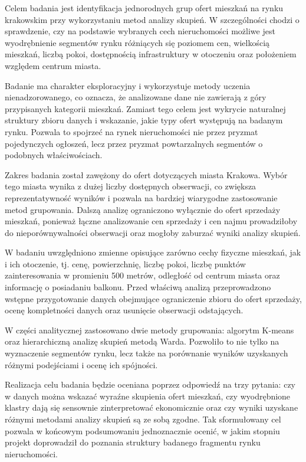 \documentclass{report}
\begin{document}
Celem badania jest identyfikacja jednorodnych grup ofert mieszkań na rynku krakowskim przy wykorzystaniu metod analizy skupień. W szczególności chodzi o sprawdzenie, czy na podstawie wybranych cech nieruchomości możliwe jest wyodrębnienie segmentów rynku różniących się poziomem cen, wielkością mieszkań, liczbą pokoi, dostępnością infrastruktury w otoczeniu oraz położeniem względem centrum miasta.

Badanie ma charakter eksploracyjny i wykorzystuje metody uczenia nienadzorowanego, co oznacza, że analizowane dane nie zawierają z góry przypisanych kategorii mieszkań. Zamiast tego celem jest wykrycie naturalnej struktury zbioru danych i wskazanie, jakie typy ofert występują na badanym rynku. Pozwala to spojrzeć na rynek nieruchomości nie przez pryzmat pojedynczych ogłoszeń, lecz przez pryzmat powtarzalnych segmentów o podobnych właściwościach.

Zakres badania został zawężony do ofert dotyczących miasta Krakowa. Wybór tego miasta wynika z dużej liczby dostępnych obserwacji, co zwiększa reprezentatywność wyników i pozwala na bardziej wiarygodne zastosowanie metod grupowania. Dalszą analizę ograniczono wyłącznie do ofert sprzedaży mieszkań, ponieważ łączne analizowanie cen sprzedaży i cen najmu prowadziłoby do nieporównywalności obserwacji oraz mogłoby zaburzać wyniki analizy skupień.

W badaniu uwzględniono zmienne opisujące zarówno cechy fizyczne mieszkań, jak i ich otoczenie, tj. cenę, powierzchnię, liczbę pokoi, liczbę punktów zainteresowania w promieniu 500 metrów, odległość od centrum miasta oraz informację o posiadaniu balkonu. Przed właściwą analizą przeprowadzono wstępne przygotowanie danych obejmujące ograniczenie zbioru do ofert sprzedaży, ocenę kompletności danych oraz usunięcie obserwacji odstających.

W części analitycznej zastosowano dwie metody grupowania: algorytm K-means oraz hierarchiczną analizę skupień metodą Warda. Pozwoliło to nie tylko na wyznaczenie segmentów rynku, lecz także na porównanie wyników uzyskanych różnymi podejściami i ocenę ich spójności.

Realizacja celu badania będzie oceniana poprzez odpowiedź na trzy pytania: czy w danych można wskazać wyraźne skupienia ofert mieszkań, czy wyodrębnione klastry dają się sensownie zinterpretować ekonomicznie oraz czy wyniki uzyskane różnymi metodami analizy skupień są ze sobą zgodne. Tak sformułowany cel pozwala w końcowym podsumowaniu jednoznacznie ocenić, w jakim stopniu projekt doprowadził do poznania struktury badanego fragmentu rynku nieruchomości.
\end{document}
